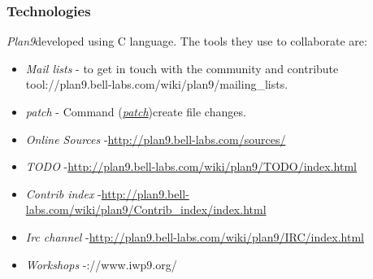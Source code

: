 \subsubsection{ Technologies}\textit{Plan9}\nolinebreakis developed using C language. The tools they use to collaborate are:
\begin{itemize}
	\item \textit{Mail lists} - to get in touch with the community and contribute tool\nolinebreakhttp://plan9.bell-labs.com/wiki/plan9/mailing\_lists.
	\item \textit{patch} - Command (\href{http://plan9.bell-labs.com/magic/man2html/1/patch}{\textit{patch}})\nolinebreakto create file changes.
	\item \textit{Online Sources} -\nolinebreak\href{http://plan9.bell-labs.com/sources/}{http://plan9.bell-labs.com/sources/}
	\item \textit{TODO} -\nolinebreak\href{http://plan9.bell-labs.com/wiki/plan9/TODO/index.html}{http://plan9.bell-labs.com/wiki/plan9/TODO/index.html}
	\item \textit{Contrib index} -\nolinebreak\href{http://plan9.bell-labs.com/wiki/plan9/Contrib_index/index.html}{http://plan9.bell-labs.com/wiki/plan9/Contrib\_index/index.html}
	\item \textit{Irc channel} -\nolinebreak\href{http://plan9.bell-labs.com/wiki/plan9/IRC/index.html}{http://plan9.bell-labs.com/wiki/plan9/IRC/index.html}
	\item \textit{Workshops} -\nolinebreakhttp://www.iwp9.org/
\end{itemize}

